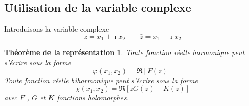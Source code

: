 \subsection{Utilisation de la variable complexe} \label{ssec:Ch08-1.3}
Introduisons la variable complexe 
\begin{equation}
  z=x_1+\imath x_2 \qquad \bar{z}=x_1-\imath x_2
\label{eq:Ch08-027}
\end{equation}
\newtheorem*{TRep}{Théorème de la représentation}
\begin{TRep}
Toute fonction réelle harmonique peut s'écrire sous la forme 
\begin{equation}
    \varphi(x_1,x_2)=\Re \left[ F(z) \right]
    \label{eq:Ch08-028}
\end{equation}
Toute fonction réelle biharmonique peut s'écrire sous la forme 
\begin{equation}
    \chi(x_1,x_2)=\Re \left[ \bar{z}G(z)+K(z) \right]
    \label{eq:Ch08-029}
\end{equation}
avec $F$ , $G$ et $K$ fonctions holomorphes. 
\end{TRep}
